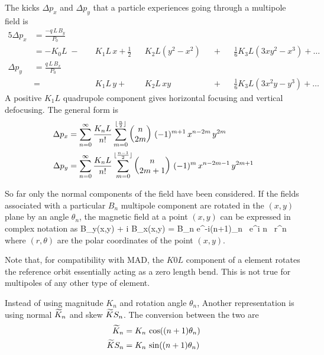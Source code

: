 The kicks $\Delta p_x$ and $\Delta p_y$ that a
particle experiences going through a multipole field is
\begin{alignat}{5}
  \Delta p_x & = \frac{-q \, L \, B_y}{P_0} \label{pqlbp1} \\
             & = -K_0 L \;-\; 
             && K_1 L \, x \plus 
             \frac{1}{2} && K_2 L (y^2 - x^2) && \plus 
             && \frac{1}{6} K_3 L (3x y^2 - x^3) \plus \ldots 
             \nonumber \\
  \Delta p_y & = \frac{q \, L \, B_x}{P_0} \label{pqlbp2} \\
             & =     
             && K_1 L \, y \plus 
             && K_2 L \, xy && \plus 
             && \frac{1}{6} K_3L (3x^2 y - y^3) \plus \ldots \nonumber 
\end{alignat}
A positive $K_1L$ quadrupole component gives
horizontal focusing and vertical defocusing. The general form is
\begin{align}
  \Delta p_x &= \sum_{n = 0}^{\infty} \frac{K_n L}{n!} 
             \sum_{m = 0}^{\lfloor \frac{n}{2} \rfloor}
             \begin{pmatrix} n \cr 2m \end{pmatrix} \,
             (-1)^{m+1} \, x^{n-2m} \, y^{2m} \\
  \Delta p_y &= \sum_{n = 0}^{\infty} \frac{K_n L}{n!} 
             \sum_{m = 0}^{\lfloor \frac{n-1}{2} \rfloor}
             \begin{pmatrix} n \cr 2m+1 \end{pmatrix} \,
             (-1)^{m} \, x^{n-2m-1} \, y^{2m+1}
\end{align}

So far only the normal components of the field have been
considered. If the fields associated with a particular $B_n$ multipole
component are rotated in the $(x, y)$ plane by an angle $\theta_n$, the
magnetic field at a point $(x,y)$ can be expressed in complex notation
as
\Begineq
  B_y(x,y) + i B_x(x,y) = 
     B_n e^{-i(n+1)\theta_n} \, e^{i n \theta} \, r^n 
  \label{bib1nb}
\Endeq
where $(r, \theta)$ are the polar coordinates of the point $(x, y)$.

Note that, for compatibility with MAD, the $K0L$ component of a  element
rotates the reference orbit essentially acting as a zero length bend. This is not true
for multipoles of any other type of element.

Instead of using magnitude $K_n$ and rotation angle $\theta_n$,
Another representation is using normal $\widetilde K_n$ and skew $\widetilde
KS_n$. The conversion between the two are
\begin{align}
  \widetilde K_n  &= K_n \, \cos((n + 1) \theta_n) \nonumber \\
  \widetilde KS_n &= K_n \, \sin((n + 1) \theta_n) 
\end{align}


